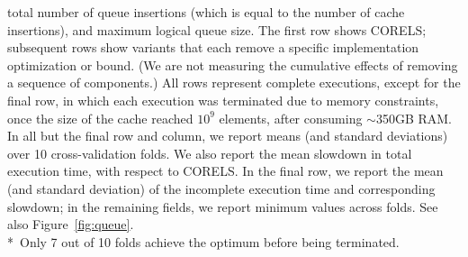 \begin{table}[t!]
{total number of queue insertions (which is equal to the number of cache insertions),
and maximum logical queue size.
%
The first row shows CORELS; subsequent rows show variants
that each remove a specific implementation optimization or bound.
%
(We are not measuring the cumulative effects of removing a sequence of components.)
%
All rows represent complete executions, except for the final row,
in which each execution was terminated due to memory constraints,
once the size of the cache reached ${10^9}$ elements,
after consuming $\sim$350GB RAM.
%
In all but the final row and column, we report means
(and standard deviations) over 10 cross-validation folds.
%
We also report the  mean slowdown in total execution time,
with respect to CORELS.
%
In the final row, we report the mean (and standard deviation) of the
incomplete execution time and corresponding slowdown;
in the remaining fields, we report minimum values across folds.
%
See also Figure~\ref{fig:queue}. \\
%
*~Only 7 out of 10 folds achieve the optimum before being terminated.
}
\vspace{4mm}
\label{tab:ablation}
\end{table}

